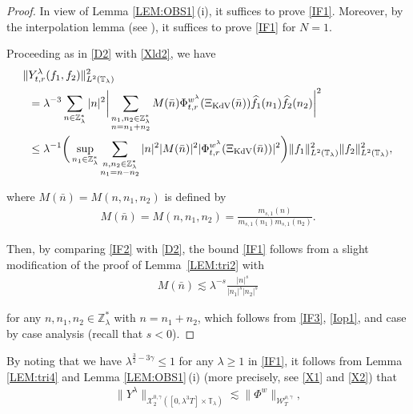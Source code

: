 \documentclass[letterpaper, 11pt,  reqno]{amsart}
\newcommand{\1}{\hspace{0.5mm}\text{I}\hspace{0.5mm}}
\newcommand{\noi}{\noindent}
\newcommand{\Z}{\mathbb{Z}}
\newcommand{\T}{\mathbb{T}}
\newcommand{\g}{\gamma}
\newcommand{\ld}{\lambda}
\newcommand{\ft}{\widehat}
\newcommand{\les}{\lesssim}
\newcommand{\cX}{\mathcal{X}}
\newcommand{\W}{\mathcal{W}}
\newcommand{\KDV}{\text{\rm KdV} }
\numberwithin{equation}{section}
\numberwithin{theorem}{section}
\begin{document}
\begin{proof}


In view of Lemma  \ref{LEM:OBS1}\,(i), 
it suffices to prove \eqref{IF1}.
Moreover, by the interpolation lemma (see \cite[Lemma 12.1]{CKSTT04}),
 it suffices to prove \eqref{IF1} for $N = 1$. 

Proceeding as in \eqref{D2} with \eqref{Xld2}, we have 
 \begin{align}
\begin{aligned}
\|  & Y^{\ld}_{t,r}( f _1, f _2)  \|^2_{L^2(\T_\ld)}\\
&=
\ld^{-3} \sum_{ n\in\Z_\ld^*}
|n|^2 \bigg|  \sum_{ \substack{n_1, n_2 \in \Z_\ld^*\\n = n_1+n_2}}
 M (\bar n)
\Phi^{w^\ld}_{t,r}(\Xi_\KDV(\bar n) ) 
\ft f _1(n_1)
\ft  f _2 (n_2)
\bigg|^2 \\
& \leq \ld^{-1}
\bigg(\sup_{n_1 \in \Z_\ld^*}
\sum_{\substack{n, n_2 \in \Z_\ld^*\\n_1 = n - n_2}} 
|n|^2 | M (\bar n)|^2
|\Phi^{w^\ld}_{t,r} (\Xi_\KDV(\bar n)) |^2 \bigg)
\|f_1\|_{L^2(\T_\ld)}^2
\|f_2\|_{L^2(\T_\ld)}^2, 
\end{aligned}
\label{IF2}
\end{align}



\noi
where $ M (\bar n) =  M(n,n_1, n_2)$ is defined by 
\begin{align}
M (\bar n) =  M(n,n_1, n_2)=
\frac{m_{s, 1}(n) }
{m_{s, 1}(n_1) m_{s, 1}(n_2)}.
\label{IF3}
\end{align}
 
 
\noi
Then, 
by comparing \eqref{IF2} with \eqref{D2}, 
the bound 
\eqref{IF1} follows from a slight modification of  the proof of Lemma~\ref{LEM:tri2}
with 
\begin{align*}
 M (\bar n) \les \ld^{-s} \frac{|n|^{s}}{|n_1|^{s}|n_2|^{s}}
\end{align*}

\noi
for any $n, n_1, n_2 \in \Z_\ld^*$
with $n = n_1 + n_2$, 
which follows from  \eqref{IF3},  \eqref{Iop1}, and case by case analysis
(recall that $s < 0$).
\end{proof}




By noting that we have 
$ \ld^{ \frac32  -3\g} \le 1$
for any $\ld \ge 1$
in \eqref{IF1}, 
it follows from Lemma \ref{LEM:tri4} and 
Lemma \ref{LEM:OBS1}\,(i)
(more precisely, see \eqref{X1} and \eqref{X2})
that 
\begin{align}
\|Y^\ld\|_{\cX^{0, \g}_2([0, \ld^3T] \times \T_\ld)}
\les  
  \|\Phi^{w}\|_{\W_{T}^{\rho, \g}}, 
\label{I15x}
\end{align}
\end{document}
